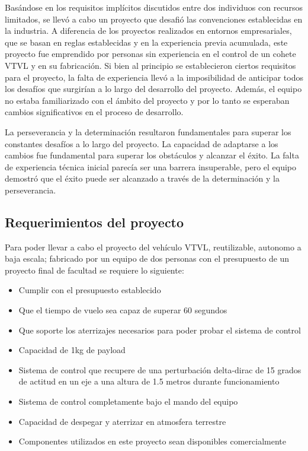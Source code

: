 Basándose en los requisitos implícitos discutidos entre dos individuos con recursos limitados, se llevó a cabo un proyecto que desafió las convenciones establecidas en la industria. A diferencia de los proyectos realizados en entornos empresariales, que se basan en reglas establecidas y en la experiencia previa acumulada, este proyecto fue emprendido por personas sin experiencia en el control de un cohete VTVL y en su fabricación. Si bien al principio se establecieron ciertos requisitos para el proyecto, la falta de experiencia llevó a la imposibilidad de anticipar todos los desafíos que surgirían a lo largo del desarrollo del proyecto. Además, el equipo no estaba familiarizado con el ámbito del proyecto y por lo tanto se esperaban cambios significativos en el proceso de desarrollo.

La perseverancia y la determinación resultaron fundamentales para superar los constantes desafíos a lo largo del proyecto. La capacidad de adaptarse a los cambios fue fundamental para superar los obstáculos y alcanzar el éxito. La falta de experiencia técnica inicial parecía ser una barrera insuperable, pero el equipo demostró que el éxito puede ser alcanzado a través de la determinación y la perseverancia.

\subsection*{Requerimientos del proyecto}
Para poder llevar a cabo el proyecto del vehículo VTVL, reutilizable, autonomo a baja escala; fabricado por un equipo de dos personas con el presupuesto de un proyecto final de facultad se requiere lo siguiente:
\begin{itemize}
    \item Cumplir con el presupuesto establecido
    \item Que el tiempo de vuelo sea capaz de superar 60 segundos
    \item Que soporte los aterrizajes necesarios para poder probar el sistema de control
    \item Capacidad de 1kg de payload
    \item Sistema de control que recupere de una perturbación delta-dirac de 15 grados de actitud en un eje a una altura de 1.5 metros durante funcionamiento
    \item Sistema de control completamente bajo el mando del equipo
    \item Capacidad de despegar y aterrizar en atmosfera terrestre
    \item Componentes utilizados en este proyecto sean disponibles comercialmente
\end{itemize}


